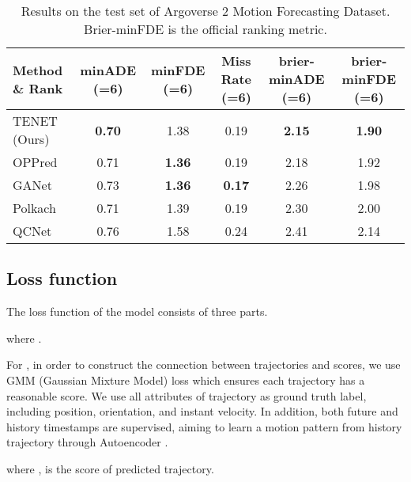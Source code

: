 \documentclass[10pt,twocolumn,letterpaper]{article}
\begin{document}
\begin{table*}[t]
  \caption{Results on the test set of Argoverse 2 Motion Forecasting Dataset. Brier-minFDE is the official ranking metric.}
  \label{leaderboard}
  \centering
  \begin{tabular}{llllll}
    \toprule
    Method \& Rank & \multicolumn{1}{c}{minADE (=6)} & \multicolumn{1}{c}{minFDE (=6)} &  \multicolumn{1}{c}{Miss Rate (=6)} & \multicolumn{1}{c}{brier-minADE (=6)} &  \multicolumn{1}{c}{brier-minFDE (=6)} \\
    \midrule
    TENET  (Ours) & \multicolumn{1}{c}{\textbf{0.70}} & \multicolumn{1}{c}{1.38} &  \multicolumn{1}{c}{0.19} & \multicolumn{1}{c}{\textbf{2.15}} &  \multicolumn{1}{c}{\textbf{1.90}} \\
    OPPred  & \multicolumn{1}{c}{0.71} & \multicolumn{1}{c}{\textbf{1.36}} &  \multicolumn{1}{c}{0.19} & \multicolumn{1}{c}{2.18} &  \multicolumn{1}{c}{1.92} \\
    GANet  & \multicolumn{1}{c}{0.73} & \multicolumn{1}{c}{\textbf{1.36}} &  \multicolumn{1}{c}{\textbf{0.17}} & \multicolumn{1}{c}{2.26} &  \multicolumn{1}{c}{1.98} \\
    Polkach  & \multicolumn{1}{c}{0.71} & \multicolumn{1}{c}{1.39} &  \multicolumn{1}{c}{0.19} & \multicolumn{1}{c}{2.30} &  \multicolumn{1}{c}{2.00} \\
    QCNet  & \multicolumn{1}{c}{0.76} & \multicolumn{1}{c}{1.58} &  \multicolumn{1}{c}{0.24} & \multicolumn{1}{c}{2.41} &  \multicolumn{1}{c}{2.14} \\

    \bottomrule
  \end{tabular}
\end{table*}

\subsection{Loss function}
The loss function of the model consists of three parts.
\begin{center}
    
\end{center}
where .
    
For , in order to construct the connection between trajectories and scores, we use GMM (Gaussian Mixture Model) \cite{reynolds2015gaussian} loss which ensures each trajectory has a reasonable score. We use all attributes of trajectory as ground truth label, including position, orientation, and instant velocity. In addition, both future and history timestamps are supervised, aiming to learn a motion pattern from history trajectory through Autoencoder \cite{liou2014autoencoder}.
\begin{center}
    
\end{center}
where ,  is the score of  predicted trajectory.
    
\end{document}
